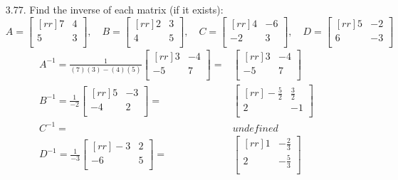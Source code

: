 \documentclass[12pt]{article}
\begin{document}
\begin{enumerate}
\item [3.77.] Find the inverse of each matrix (if it exists):
	\[ 	A= \begin{bmatrix}[rr] 7 & 4\\ 5 & 3\\ \end{bmatrix}, \quad
		B= \begin{bmatrix}[rr] 2 & 3\\ 4 & 5\\ \end{bmatrix}, \quad
		C= \begin{bmatrix}[rr] 4 & -6\\ -2 & 3\\ \end{bmatrix}, \quad
		D= \begin{bmatrix}[rr] 5 & -2\\ 6 & -3\\ \end{bmatrix} \]
	\begin{align*}
		A^{-1}= \frac{1}{(7)(3)-(4)(5)} \begin{bmatrix}[rr] 3 & -4\\ -5 & 7\\ \end{bmatrix}
		= &\begin{bmatrix}[rr] 3 & -4\\ -5 & 7\\ \end{bmatrix}\\
		B^{-1}= \frac{1}{-2} \begin{bmatrix}[rr] 5 & -3\\ -4 & 2\\ \end{bmatrix}
		= &\begin{bmatrix}[rr] -\frac{5}{2} & \frac{3}{2}\\ 2 & -1\\ \end{bmatrix}\\
		C^{-1}=& undefined\\
		D^{-1}= \frac{1}{-3} \begin{bmatrix}[rr] -3 & 2\\ -6 & 5\\ \end{bmatrix}
		= &\begin{bmatrix}[rr] 1 & -\frac{2}{3}\\ 2 & -\frac{5}{3}\\ \end{bmatrix}
	\end{align*}



\end{enumerate}
\end{document}
